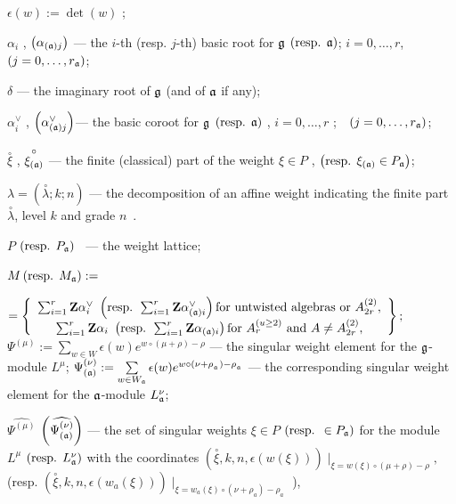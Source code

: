 \documentclass[12pt]{iopart}
\newcommand{\co}[1]{\stackrel{\circ }{#1}}
\begin{document}
$\epsilon \left( w\right) :=\det \left( w\right) $ ;

$\alpha _{i}$ , $\left( \alpha _{\left( \frak{a}\right) j}\right) $ --- the $i
$-th (resp. $j$-th) basic root for $\frak{g}$ $\left( \mbox{resp. }\frak{a}%
\right) $; $i=0,\ldots ,r$,\ \ $\left( j=0,\ldots ,r_{\frak{a}}\right) $;

$\delta $ --- the imaginary root of $\frak{g}$ (and of $\frak{a}$ if any);

$\alpha _{i}^{\vee }$ , $\left( \alpha _{\left( \frak{a}\right) j}^{\vee
}\right) $--- the basic coroot for $\frak{g}$ $\left( \mbox{resp. }\frak{a}%
\right) $ , $i=0,\ldots ,r$ ;\ \ $\left( j=0,\ldots ,r_{\frak{a}}\right) $;

$\co{\xi }$ , $\co{\xi _{\left( \frak{a}\right) }}$
--- the finite (classical) part of the weight $\xi \in P$ , $\left( \mbox{%
resp. }\xi _{\left( \frak{a}\right) }\in P_{\frak{a}}\right) $;

$\lambda =\left( \co{\lambda };k;n\right) $ --- the
decomposition of an affine weight indicating the finite part $\co{\lambda }$, level $k$ and grade $n$\ .

$P$ $\left( \mbox{resp. } P_{\frak{a}}\right) $ \ --- the weight lattice;

$M \left( \mbox{resp. }M_{\frak{a}}\right) :=$

\noindent $=\left\{
\begin{array}{c}
\sum_{i=1}^{r}\mathbf{Z}\alpha _{i}^{\vee }\mbox{ }\left( \mbox{resp. }%
\sum_{i=1}^{r}\mathbf{Z}\alpha _{\left( \frak{a}\right) i}^{\vee }\right)
\mbox{for untwisted algebras or }A_{2r}^{\left( 2\right) }, \\
\sum_{i=1}^{r}\mathbf{Z}\alpha _{i}\mbox{ }\left( \mbox{resp. }\sum_{i=1}^{r}%
\mathbf{Z}\alpha _{\left( \frak{a}\right) i}\right) \mbox{for }A_{r}^{\left(
u\geq 2\right) }\mbox{ and }A\neq A_{2r}^{\left( 2\right) },
\end{array}
\right\} ;$\\
$\Psi ^{\left( \mu \right) }:=\sum\limits_{w\in W}\epsilon (w)e^{w\circ (\mu +\rho )-\rho }$ --- the singular weight element for the $\frak{g}$-module $L^{\mu }$;
$\Psi _{\left( \frak{a}\right) }^{\left( \nu \right) }:=\sum\limits_{w\in W_{\frak{a}}}\epsilon (w)e^{w\circ (\nu +\rho
_{_{\frak{a}}})-\rho _{_{\frak{a}}}}$ --- the corresponding singular weight
element for the $\frak{a}$-module $L_{\frak{a}}^{\nu }$;

$\widehat{\Psi ^{\left( \mu \right) }}$ $\left( \widehat{\Psi _{\left( \frak{%
a}\right) }^{\left( \nu \right) }}\right) $ --- the set of singular weights $%
\xi \in P$ $\left( \mbox{resp. }\in P_{\frak{a}}\right) $ for the module $%
L^{\mu }$ $\left( \mbox{resp. }L_{\frak{a}}^{\nu }\right) $ with the
coordinates $\left( \co{\xi },k,n,\epsilon \left( w\left( \xi
\right) \right) \right) \mid _{\xi =w\left( \xi \right) \circ (\mu +\rho
)-\rho },$ (resp. $\left( \co{\xi },k,n,\epsilon \left(
w_{a}\left( \xi \right) \right) \right) \mid _{\xi =w_{a}\left( \xi \right)
\circ (\nu +\rho _{a})-\rho _{a}}$ ), 
\end{document}
